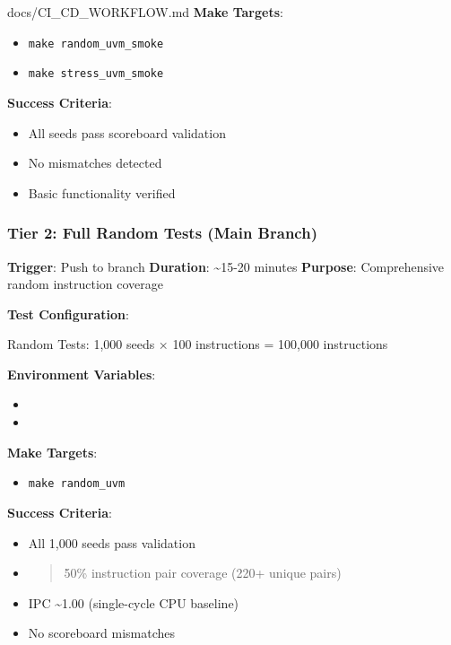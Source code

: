 \begin{relocated}{docs/CI_CD_WORKFLOW.md}
\textbf{Make Targets}:

\begin{itemize}
\tightlist
\item
  \texttt{make\ random\_\allowbreak{}uvm\_\allowbreak{}smoke}
\item
  \texttt{make\ stress\_\allowbreak{}uvm\_\allowbreak{}smoke}
\end{itemize}

\textbf{Success Criteria}:

\begin{itemize}
\tightlist
\item
  All seeds pass scoreboard validation
\item
  No mismatches detected
\item
  Basic functionality verified
\end{itemize}

\subsubsection{Tier 2: Full Random Tests (Main Branch)}\label{um:flow:ci-cd-workflow:tier-2-full-random-tests-main-branch}

\textbf{Trigger}: Push to  branch \textbf{Duration}:
\textasciitilde15-20 minutes \textbf{Purpose}: Comprehensive random
instruction coverage

\textbf{Test Configuration}:

\begin{textblock}
Random Tests:  1,000 seeds × 100 instructions = 100,000 instructions
\end{textblock}

\textbf{Environment Variables}:

\begin{itemize}
\tightlist
\item
\item
\end{itemize}

\textbf{Make Targets}:

\begin{itemize}
\tightlist
\item
  \texttt{make\ random\_\allowbreak{}uvm}
\end{itemize}

\textbf{Success Criteria}:

\begin{itemize}
\item
  All 1,000 seeds pass validation
\item
  \begin{quote}
  50\% instruction pair coverage (220+ unique pairs)
  \end{quote}
\item
  IPC \textasciitilde1.00 (single-cycle CPU baseline)
\item
  No scoreboard mismatches
\end{itemize}


\end{relocated}
